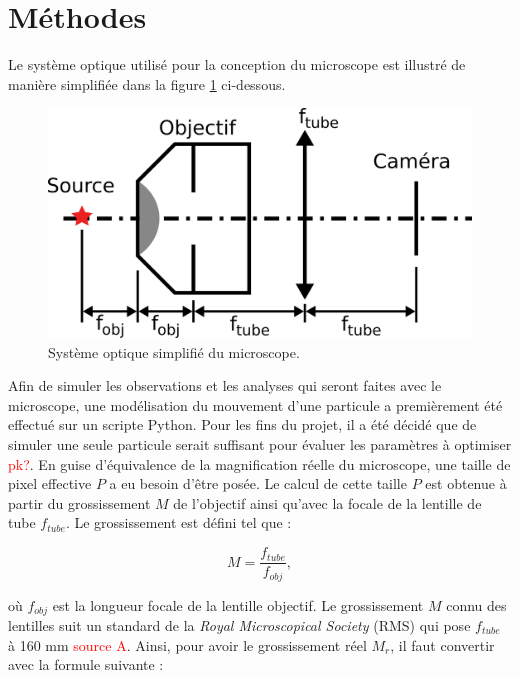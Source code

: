 \documentclass[conference]{IEEEtran}
\begin{document}
\section{Méthodes \label{methodes}}
Le système optique utilisé pour la conception du microscope est illustré de manière simplifiée
dans la figure \ref{sys} ci-dessous.
\begin{figure}[H]
  \centering
  \includegraphics[scale=2.3]{systeme.png}
  \caption{Système optique simplifié du microscope.}
  \label{sys}
\end{figure}
Afin de simuler les observations et les analyses qui seront faites avec le microscope,
une modélisation du mouvement d'une particule a premièrement été effectué sur un scripte Python.
Pour les fins du projet, il a été décidé que de simuler une seule particule serait suffisant pour
évaluer les paramètres à optimiser \textcolor{red}{pk?}. En guise d'équivalence de la magnification réelle du microscope, 
une taille de pixel effective $P$ a eu besoin d'être posée. Le calcul de cette taille $P$ est obtenue à partir du grossissement $M$ de l'objectif ainsi qu'avec la
focale de la lentille de tube $f_{tube}$. Le grossissement est défini tel que :

\begin{equation}
  M = \frac{f_{tube}}{f_{obj}},
\end{equation}

où $f_{obj}$ est la longueur focale de la lentille objectif. Le grossissement $M$ connu des lentilles suit
un standard de la \textit{Royal Microscopical Society} (RMS) qui pose $f_{tube}$ à 160 mm
\textcolor{red}{source A}. Ainsi, pour avoir le grossissement réel $M_{r}$, il faut convertir avec la 
formule suivante :

\end{document}
